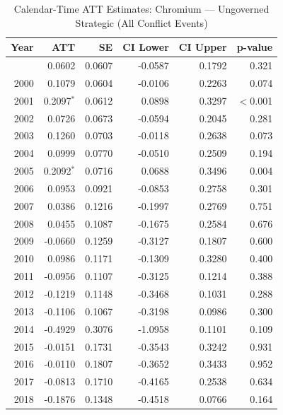 \begin{longtable}{rrrrrr}
\caption{Calendar-Time ATT Estimates: Chromium --- Ungoverned Strategic (All Conflict Events)} \label{tab:cal_chromium} \\
\toprule
\textbf{Year} & \textbf{ATT} & \textbf{SE} & \textbf{CI Lower} & \textbf{CI Upper} & \textbf{p-value} \\
\midrule
\endfirsthead
\bottomrule
\endlastfoot
1999 & 0.0602 & 0.0607 & -0.0587 & 0.1792 & 0.321 \\
2000 & 0.1079 & 0.0604 & -0.0106 & 0.2263 & 0.074 \\
2001 & 0.2097$^{*}$ & 0.0612 & 0.0898 & 0.3297 & $<$0.001 \\
2002 & 0.0726 & 0.0673 & -0.0594 & 0.2045 & 0.281 \\
2003 & 0.1260 & 0.0703 & -0.0118 & 0.2638 & 0.073 \\
2004 & 0.0999 & 0.0770 & -0.0510 & 0.2509 & 0.194 \\
2005 & 0.2092$^{*}$ & 0.0716 & 0.0688 & 0.3496 & 0.004 \\
2006 & 0.0953 & 0.0921 & -0.0853 & 0.2758 & 0.301 \\
2007 & 0.0386 & 0.1216 & -0.1997 & 0.2769 & 0.751 \\
2008 & 0.0455 & 0.1087 & -0.1675 & 0.2584 & 0.676 \\
2009 & -0.0660 & 0.1259 & -0.3127 & 0.1807 & 0.600 \\
2010 & 0.0986 & 0.1171 & -0.1309 & 0.3280 & 0.400 \\
2011 & -0.0956 & 0.1107 & -0.3125 & 0.1214 & 0.388 \\
2012 & -0.1219 & 0.1148 & -0.3468 & 0.1031 & 0.288 \\
2013 & -0.1106 & 0.1067 & -0.3198 & 0.0986 & 0.300 \\
2014 & -0.4929 & 0.3076 & -1.0958 & 0.1101 & 0.109 \\
2015 & -0.0151 & 0.1731 & -0.3543 & 0.3242 & 0.931 \\
2016 & -0.0110 & 0.1807 & -0.3652 & 0.3433 & 0.952 \\
2017 & -0.0813 & 0.1710 & -0.4165 & 0.2538 & 0.634 \\
2018 & -0.1876 & 0.1348 & -0.4518 & 0.0766 & 0.164 \\
\end{longtable}

